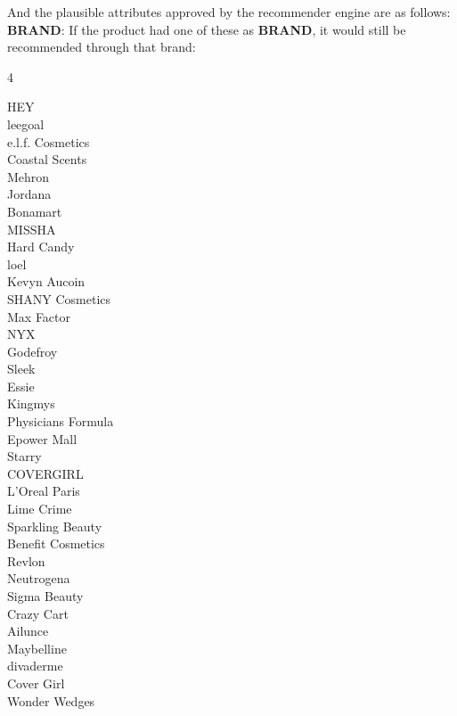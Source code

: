 \noindent And the plausible attributes approved by the recommender engine are as follows:
\noindent 
\textbf{BRAND}: If the product had one of these as \textbf{BRAND}, it would still be recommended
through that brand:
\begin{multicols}{4}
	\raggedright HEY\\ leegoal\\ e.l.f. Cosmetics\\ Coastal Scents\\ Mehron\\ Jordana\\
	Bonamart\\ MISSHA\\ Hard Candy\\ loel\\ Kevyn Aucoin\\ SHANY Cosmetics\\ Max
	Factor\\ NYX\\ Godefroy\\ Sleek\\ Essie\\ Kingmys\\ Physicians Formula\\ Epower
	Mall\\ Starry\\ COVERGIRL\\ L'Oreal Paris\\ Lime Crime\\ Sparkling Beauty\\ Benefit
	Cosmetics\\ Revlon\\ Neutrogena\\ Sigma Beauty\\ Crazy Cart\\ Ailunce\\ Maybelline\\
	divaderme\\ Cover Girl\\ Wonder Wedges
\end{multicols}


